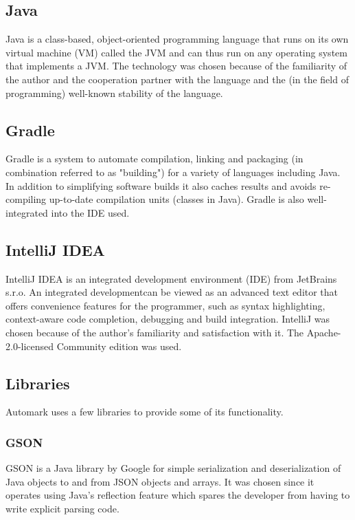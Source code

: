 \documentclass[12pt,a4paper,oneside]{report}
\begin{document}
	\subsection{Java} \label{subsec:java}
	Java is a class-based, object-oriented programming language that runs on its own virtual machine (VM) called the JVM and can thus run on any operating system that implements a JVM\parencite{oraclethejavalangenvironment}. The technology was chosen because of the familiarity of the author and the cooperation partner with the language and the (in the field of programming) well-known stability of the language.

	\subsection{Gradle} \label{subsec:gradle}
	Gradle is a system to automate compilation, linking and packaging (in combination referred to as "building") for a variety of languages including Java. In addition to simplifying software builds it also caches results and avoids re-compiling up-to-date compilation units (classes in Java). Gradle is also well-integrated into the IDE used.\parencite{gradlewebsite}

	\subsection{IntelliJ IDEA} \label{subsec:intellijidea}
	IntelliJ IDEA is an integrated development environment (IDE) from JetBrains s.r.o.\parencite{intellijwebsite} An integrated developmentcan be viewed as an advanced text editor that offers convenience features for the programmer, such as syntax highlighting, context-aware code completion, debugging and build integration\parencite{stevenjzeilintegrated}\parencite{idewikipedia}. IntelliJ was chosen because of the author's familiarity and satisfaction with it. The Apache-2.0-licensed Community edition was used.

	\subsection{Libraries}
	Automark uses a few libraries to provide some of its functionality.

	\subsubsection{GSON} \label{subsubsec:gson}
	GSON is a Java library by Google for simple serialization and deserialization of Java objects to and from JSON objects and arrays\parencite{gsongithub}. It was chosen since it operates using Java's reflection feature which spares the developer from having to write explicit parsing code.
\end{document}
